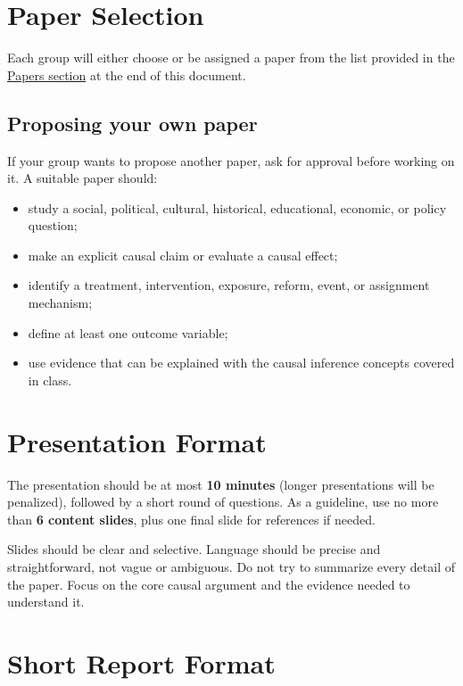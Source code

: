 \documentclass[12pt]{article}
\begin{document}
\section*{Paper Selection}

Each group will either choose or be assigned a paper from the list provided in the \hyperref[sec:papers]{Papers section} at the end of this document. 

\subsection*{Proposing your own paper}

If your group wants to propose another paper, ask for approval before working on it. A suitable paper should:

\begin{itemize}
    \item study a social, political, cultural, historical, educational, economic, or policy question;
    \item make an explicit causal claim or evaluate a causal effect;
    \item identify a treatment, intervention, exposure, reform, event, or assignment mechanism;
    \item define at least one outcome variable;
    \item use evidence that can be explained with the causal inference concepts covered in class.
\end{itemize}

\section*{Presentation Format}

The presentation should be at most \textbf{10 minutes} (longer presentations will be penalized), followed by a short round of questions. 
As a guideline, use no more than \textbf{6 content slides}, plus one final slide for references if needed.

Slides should be clear and selective. Language should be precise and straightforward, not vague or ambiguous. 
Do not try to summarize every detail of the paper. Focus on the core causal argument and the evidence needed to understand it.

\section*{Short Report Format}
\end{document}
